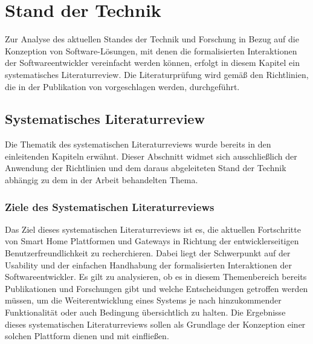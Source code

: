 \chapter{Stand der Technik}
\label{chap:technikStand}
    Zur Analyse des aktuellen Standes der Technik und Forschung in Bezug auf die Konzeption von Software-Lösungen, mit denen 
    die formalisierten Interaktionen der Softwareentwickler vereinfacht werden können, erfolgt in diesem 
    Kapitel ein systematisches Literaturreview. Die Literaturprüfung wird gemäß den Richtlinien, die in der Publikation 
    von \cite{Kitchenham2007} vorgeschlagen werden, durchgeführt. 

    \section{Systematisches Literaturreview}
    \label{subsec:systematischesLiteraturReview}
        Die Thematik des systematischen Literaturreviews wurde bereits in den einleitenden Kapiteln erwähnt. 
        Dieser Abschnitt widmet sich ausschließlich der Anwendung der Richtlinien und dem daraus abgeleiteten Stand der Technik 
        abhängig zu dem in der Arbeit behandelten Thema. 

    \subsection{Ziele des Systematischen Literaturreviews}
        Das Ziel dieses systematischen Literaturreviews ist es, die aktuellen Fortschritte von Smart Home Plattformen und 
        Gateways in Richtung der entwicklerseitigen Benutzerfreundlichkeit zu recherchieren. Dabei liegt der Schwerpunkt 
        auf der Usability und der einfachen Handhabung der formalisierten Interaktionen der Softwareentwickler. Es gilt zu 
        analysieren, ob es in diesem Themenbereich bereits Publikationen und Forschungen gibt und welche Entscheidungen 
        getroffen werden müssen, um die Weiterentwicklung eines Systems je nach hinzukommender Funktionalität oder 
        auch Bedingung übersichtlich zu halten. Die Ergebnisse dieses systematischen Literaturreviews sollen 
        als Grundlage der Konzeption einer solchen Plattform dienen und mit einfließen. 


